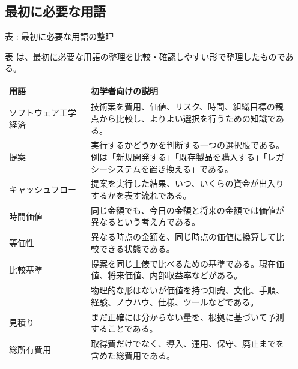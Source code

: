 \subsection*{最初に必要な用語}

\par\smallskip\noindent{}\label{tab:ch15-01}表 \thetable: 最初に必要な用語の整理\par\smallskip
表 \thetable は、最初に必要な用語の整理を比較・確認しやすい形で整理したものである。\par\smallskip
\begin{longtable}{L{0.27\linewidth} L{0.68\linewidth}}
\toprule
用語 & 初学者向けの説明 \\
\midrule
ソフトウェア工学経済 & 技術案を費用、価値、リスク、時間、組織目標の観点から比較し、よりよい選択を行うための知識である。 \\
提案 & 実行するかどうかを判断する一つの選択肢である。例は「新規開発する」「既存製品を購入する」「レガシーシステムを置き換える」である。 \\
キャッシュフロー & 提案を実行した結果、いつ、いくらの資金が出入りするかを表す流れである。 \\
時間価値 & 同じ金額でも、今日の金額と将来の金額では価値が異なるという考え方である。 \\
等価性 & 異なる時点の金額を、同じ時点の価値に換算して比較できる状態である。 \\
比較基準 & 提案を同じ土俵で比べるための基準である。現在価値、将来価値、内部収益率などがある。 \\
 & 物理的な形はないが価値を持つ知識、文化、手順、経験、ノウハウ、仕様、ツールなどである。 \\
見積り & まだ正確には分からない量を、根拠に基づいて予測することである。 \\
総所有費用 & 取得費だけでなく、導入、運用、保守、廃止までを含めた総費用である。 \\
\bottomrule
\end{longtable}

